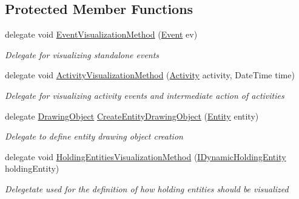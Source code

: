 \subsection*{Protected Member Functions}
\begin{DoxyCompactItemize}
\item 
delegate void \hyperlink{class_simulation_w_p_f_visualization_tools_1_1_base_w_p_f_control_unit_visualization_engine_a86023dd4efa2f4518e3f27353effa5e8}{Event\+Visualization\+Method} (\hyperlink{class_simulation_core_1_1_h_c_c_m_elements_1_1_event}{Event} ev)
\begin{DoxyCompactList}\small\item\em Delegate for visualizing standalone events \end{DoxyCompactList}\item 
delegate void \hyperlink{class_simulation_w_p_f_visualization_tools_1_1_base_w_p_f_control_unit_visualization_engine_a439b942d3344f348d72a0c88a98df938}{Activity\+Visualization\+Method} (\hyperlink{class_simulation_core_1_1_h_c_c_m_elements_1_1_activity}{Activity} activity, Date\+Time time)
\begin{DoxyCompactList}\small\item\em Delegate for visualizing activity events and intermediate action of activities \end{DoxyCompactList}\item 
delegate \hyperlink{class_w_p_f_visualization_base_1_1_drawing_object}{Drawing\+Object} \hyperlink{class_simulation_w_p_f_visualization_tools_1_1_base_w_p_f_control_unit_visualization_engine_a0bf5a50ae5ebe55e73272b1da3503c34}{Create\+Entity\+Drawing\+Object} (\hyperlink{class_simulation_core_1_1_h_c_c_m_elements_1_1_entity}{Entity} entity)
\begin{DoxyCompactList}\small\item\em Delegate to define entity drawing object creation \end{DoxyCompactList}\item 
delegate void \hyperlink{class_simulation_w_p_f_visualization_tools_1_1_base_w_p_f_control_unit_visualization_engine_a62619404394d1a38091b75e40b25af26}{Holding\+Entities\+Visualization\+Method} (\hyperlink{interface_simulation_core_1_1_h_c_c_m_elements_1_1_i_dynamic_holding_entity}{I\+Dynamic\+Holding\+Entity} holding\+Entity)
\begin{DoxyCompactList}\small\item\em Delegetate used for the definition of how holding entities should be visualized \end{DoxyCompactList}\end{DoxyCompactItemize}
